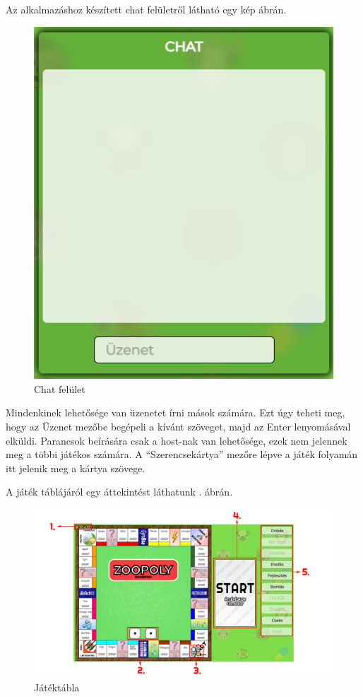 
Az alkalmazáshoz készített chat felületről látható egy kép  ábrán.

\begin{figure}[h!]
\centering
\includegraphics[scale=0.4]{images/50363fc646a02ca3f5dd4684b7066bac.png}
\caption{Chat felület}
\label{fig:chat}
\end{figure}

Mindenkinek lehetősége van üzenetet írni mások számára. Ezt úgy teheti meg, hogy az Üzenet mezőbe begépeli a kívánt szöveget, majd az Enter lenyomásával elküldi. Parancsok beírására csak a host-nak van lehetősége, ezek nem jelennek meg a többi játékos számára. A “Szerencsekártya” mezőre lépve a játék folyamán itt jelenik meg a kártya szövege.
\newpage


A játék táblájáról egy áttekintést láthatunk . ábrán.

\begin{figure}[h!]
\centering
\includegraphics[width=\textwidth]{images/Nevtelen-3.png}
\caption{Játéktábla}
\label{fig:zoopoly_table}
\end{figure}

